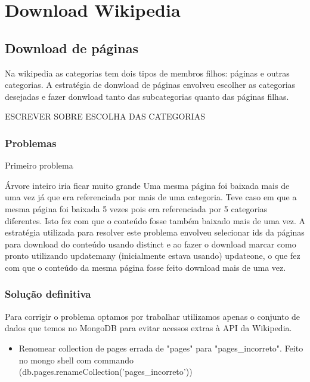 \section{Download Wikipedia}

\subsection{Download de páginas}

Na wikipedia as categorias tem dois tipos de membros filhos: páginas e outras categorias.
A estratégia de donwload de páginas envolveu escolher as categorias desejadas e fazer donwload tanto das subcategorias quanto das páginas filhas.

ESCREVER SOBRE ESCOLHA DAS CATEGORIAS

\subsubsection{Problemas}

Primeiro problema

Árvore inteiro iria ficar muito grande
Uma mesma página foi baixada mais de uma vez já que era referenciada por mais de uma categoria. Teve caso em que a mesma página foi baixada 5 vezes pois era 
referenciada por 5 categorias diferentes. Isto fez com que o conteúdo fosse também baixado mais de uma vez. A estratégia utilizada para resolver este problema 
envolveu selecionar ids da páginas para download do conteúdo usando distinct e ao fazer o download marcar como pronto utilizando updatemany (inicialmente estava 
usando) updateone, o que fez com que o conteúdo da mesma página fosse feito download mais de uma vez.

\subsubsection{Solução definitiva}

Para corrigir o problema optamos por trabalhar utilizamos apenas o conjunto de dados que temos no MongoDB para evitar acessos extras à API da Wikipedia.

\begin{itemize}
    \item Renomear collection de pages errada de "pages" para "pages\_incorreto". Feito no mongo shell com commando (db.pages.renameCollection('pages\_incorreto'))
\end{itemize}